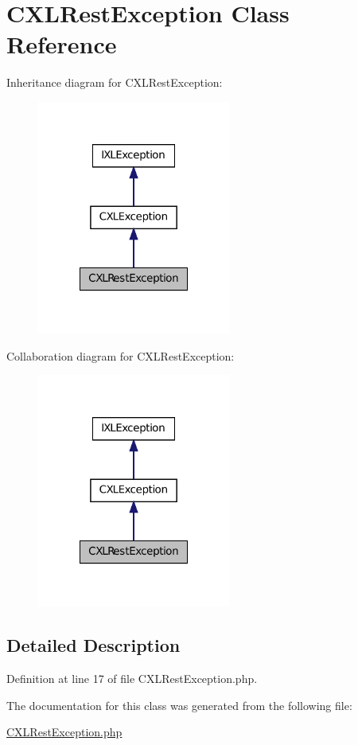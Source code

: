 \hypertarget{classCXLRestException}{
\section{CXLRestException Class Reference}
\label{classCXLRestException}
}


Inheritance diagram for CXLRestException:\nopagebreak
\begin{figure}[H]
\begin{center}
\leavevmode
\includegraphics[width=180pt]{classCXLRestException__inherit__graph}
\end{center}
\end{figure}


Collaboration diagram for CXLRestException:\nopagebreak
\begin{figure}[H]
\begin{center}
\leavevmode
\includegraphics[width=180pt]{classCXLRestException__coll__graph}
\end{center}
\end{figure}


\subsection{Detailed Description}


Definition at line 17 of file CXLRestException.php.



The documentation for this class was generated from the following file:\begin{DoxyCompactItemize}
\item 
\hyperlink{CXLRestException_8php}{CXLRestException.php}\end{DoxyCompactItemize}
